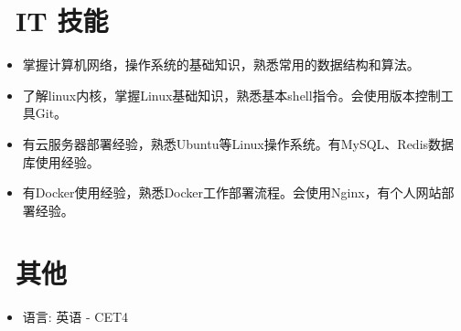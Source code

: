 \documentclass{resume}
\begin{document}
{%


\section{\faCogs\ IT 技能}
\begin{itemize}[parsep=0.5ex]
  \item 掌握计算机网络，操作系统的基础知识，熟悉常用的数据结构和算法。
  \item 了解linux内核，掌握Linux基础知识，熟悉基本shell指令。会使用版本控制工具Git。
  \item 有云服务器部署经验，熟悉Ubuntu等Linux操作系统。有MySQL、Redis数据库使用经验。
  \item 有Docker使用经验，熟悉Docker工作部署流程。会使用Nginx，有个人网站部署经验。
\end{itemize}


\section{\faInfo\ 其他}
\begin{itemize}[parsep=0.5ex]
  \item 语言: 英语 - CET4
\end{itemize}

}
%
%
\end{document}
